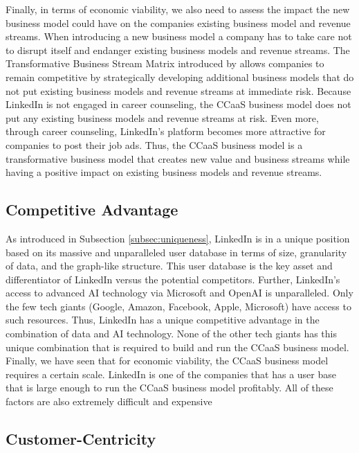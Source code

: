 Finally, in terms of economic viability, we also need to assess the impact the new business model could 
have on the companies existing business model and revenue streams. When introducing a new business model 
a company has to take care not to disrupt itself and endanger existing business models and revenue streams.
The Transformative Business Stream Matrix introduced by \citet{schwafertsTransformativeBusinessStream2016}
allows companies to remain competitive by strategically developing additional business models that do not
put existing business models and revenue streams at immediate risk. Because LinkedIn is not engaged in 
career counseling, the CCaaS business model does not put any existing business models and revenue streams
at risk. Even more, through career counseling, LinkedIn's platform becomes more attractive for companies
to post their job ads. Thus, the CCaaS business model is a transformative business model that creates new
value and business streams while having a positive impact on existing business models and revenue streams.

\subsection{Competitive Advantage}

As introduced in Subsection \ref{subsec:uniqueness}, LinkedIn is in a unique position based on its massive 
and unparalleled user database in terms of size, granularity of data, and the graph-like structure. This user
database is the key asset and differentiator of LinkedIn versus the potential competitors. Further, LinkedIn's 
access to advanced AI technology via Microsoft and OpenAI is unparalleled. Only the few tech giants (Google,
Amazon, Facebook, Apple, Microsoft) have access to such resources. Thus, LinkedIn has a unique competitive
advantage in the combination of data and AI technology. None of the other tech giants has this unique 
combination that is required to build and run the CCaaS business model. Finally, we have seen that for
economic viability, the CCaaS business model requires a certain scale. LinkedIn is one of the companies that
has a user base that is large enough to run the CCaaS business model profitably. All of these factors 
are also extremely difficult and expensive 

\subsection{Customer-Centricity}

